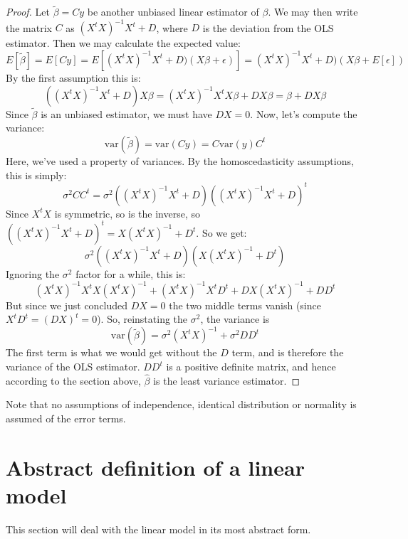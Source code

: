 \documentclass[12pt, a4paper]{article}
\begin{document}
\begin{proof}
Let $\tilde{\beta}=Cy$ be another unbiased linear estimator of $\beta$. We may  then write the matrix $C$ as $(X^t X)^{-1}X^t+D$, where $D$ is the deviation from the OLS estimator. Then we may calculate the expected value:
\begin{equation}
E[\tilde{\beta}]=E[Cy]=E[(X^t X)^{-1}X^t+D)(X\beta+\epsilon)]=(X^t X)^{-1}X^t+D)(X\beta+E[\epsilon])
\end{equation}
By the first assumption this is:
\begin{equation}
((X^t X)^{-1}X^t+D)X\beta=(X^t X)^{-1}X^t X\beta+DX\beta=\beta+DX\beta
\end{equation}
Since $\tilde{\beta}$ is an unbiased estimator, we must have $DX=0$. Now, let's compute the variance:
\begin{equation}
\textrm{var}(\tilde{\beta})=\textrm{var}(Cy)=C\textrm{var}(y)C^t
\end{equation}
Here, we've used a property of variances. By the homoscedasticity assumptions, this is simply:
\begin{equation}
\sigma^2 CC^t=\sigma^2((X^t X)^{-1}X^t+D)((X^t X)^{-1}X^t+D)^t
\end{equation}
Since $X^t X$ is symmetric, so is the inverse, so $((X^t X)^{-1}X^t+D)^t=X(X^t X)^{-1}+D^t$. So we get:
\begin{equation}
\sigma^2((X^t X)^{-1}X^t+D)(X(X^t X)^{-1}+D^t)
\end{equation}
Ignoring the $\sigma^2$ factor for a while, this is:
\begin{equation}
(X^t X)^{-1}X^tX(X^t X)^{-1}+(X^t X)^{-1}X^tD^t+DX(X^t X)^{-1}+DD^t
\end{equation}
But since we just concluded $DX=0$ the two middle terms vanish (since $X^tD^t=(DX)^t=0$). So, reinstating the $\sigma^2$, the variance is
\begin{equation}
\textrm{var}(\tilde{\beta})=\sigma^2(X^t X)^{-1}+\sigma^2 DD^t
\end{equation}
The first term is what we would get without the $D$ term, and is therefore the variance of the OLS estimator. $DD^t$ is a positive definite matrix, and hence according to the section above, $\hat{\beta}$ is the least variance estimator.
\end{proof}

Note that no assumptions of independence, identical distribution or normality is assumed of the error terms.

\section{Abstract definition of a linear model}
This section will deal with the linear model in its most abstract form.
\end{document}
